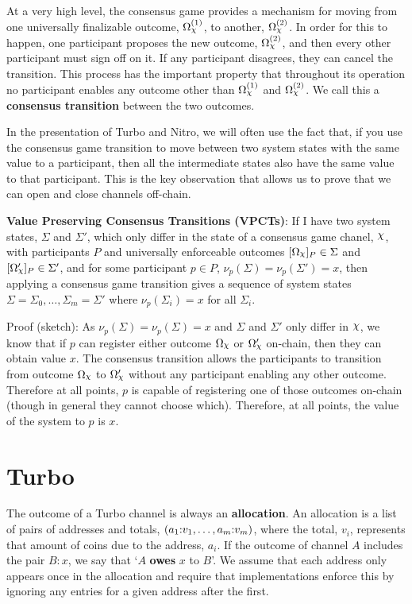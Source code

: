 \documentclass{article}
\begin{document}
At a very high level, the consensus game provides a mechanism for moving from one universally
finalizable outcome, $\Omega_\rchi^{(1)}$, to another, $\Omega_\rchi^{(2)}$. 
In order for this to happen, one participant proposes the new outcome, $\Omega_\rchi^{(2)}$, and then
every other participant must sign off on it. 
If any participant disagrees, they can cancel the transition.
This process has the important property that throughout its operation no participant enables
any outcome other than $\Omega_\rchi^{(1)}$ and $\Omega_\rchi^{(2)}$.
We call this a \textbf{consensus transition} between the two outcomes.

In the presentation of Turbo and Nitro, we will often use the fact that, if you use the
consensus game transition to move between two system states with the same value to a
participant, then all the intermediate states also have the same value to that participant.
This is the key observation that allows us to prove that we can open and close channels
off-chain.

\textbf{Value Preserving Consensus Transitions (VPCTs)}:
If I have two system states, $\Sigma$ and $\Sigma'$, which only differ in the state of
a consensus game chanel, $\rchi$, with participants $P$ and universally enforceable outcomes
$\enf{\Omega_\rchi}_P \in \Sigma$ and $\enf{\Omega'_\rchi}_P \in \Sigma'$, and 
for some participant $p \in P$, $\nu_p(\Sigma) = \nu_p(\Sigma') = x$, then
applying a consensus game transition gives a sequence of system states 
$\Sigma = \Sigma_0, \dots, \Sigma_m = \Sigma'$ where $\nu_p(\Sigma_i) = x$ for all $\Sigma_i$.

Proof (sketch): As $\nu_p(\Sigma) = \nu_p(\Sigma) = x$ and $\Sigma$ and $\Sigma'$ only differ
in $\rchi$, we know that if $p$ can register either outcome $\Omega_\rchi$ or $\Omega'_\rchi$ on-chain, then
they can obtain value $x$. The consensus transition allows the participants to transition
from outcome $\Omega_\rchi$ to $\Omega'_\rchi$ without any participant enabling any other outcome.
Therefore at all points, $p$ is capable of registering one of those outcomes on-chain (though
in general they cannot choose which).
Therefore, at all points, the value of the system to $p$ is $x$.

\section{Turbo}

The outcome of a Turbo channel is always an \textbf{allocation}.
An allocation is a list of pairs of addresses and totals, $( a_1{:}v_1, \dots, a_m{:}v_m )$, where the total, $v_i$, represents that amount of coins due to the address, $a_i$.
If the outcome of channel $A$ includes the pair $B{:}x$, we say that `$A$ \textbf{owes} $x$ to $B$'.
We assume that each address only appears once in the allocation and require that implementations enforce this by ignoring any entries for a given address after the first.
\end{document}
